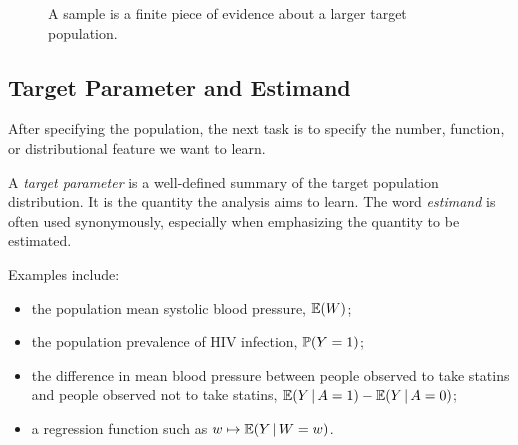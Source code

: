\begin{figure}[H]
\centering
{}
\caption{A sample is a finite piece of evidence about a larger target population.}
\end{figure}

\subsection{Target Parameter and Estimand}

After specifying the population, the next task is to specify the number, function, or distributional feature we want to learn.

\begin{definition}
A \emph{target parameter} is a well-defined summary of the target population distribution. It is the quantity the analysis aims to learn. The word \emph{estimand} is often used synonymously, especially when emphasizing the quantity to be estimated.
\end{definition}

Examples include:
\begin{itemize}
  \item the population mean systolic blood pressure, $\mathbb{E}(W)$;
  \item the population prevalence of HIV infection, $\mathbb{P}(Y=1)$;
  \item the difference in mean blood pressure between people observed to take statins and people observed not to take statins, $\mathbb{E}(Y\,\vert\, A=1)-\mathbb{E}(Y\,\vert\, A=0)$;
  \item a regression function such as $w \mapsto \mathbb{E}(Y\,\vert\, W=w)$.
\end{itemize}

